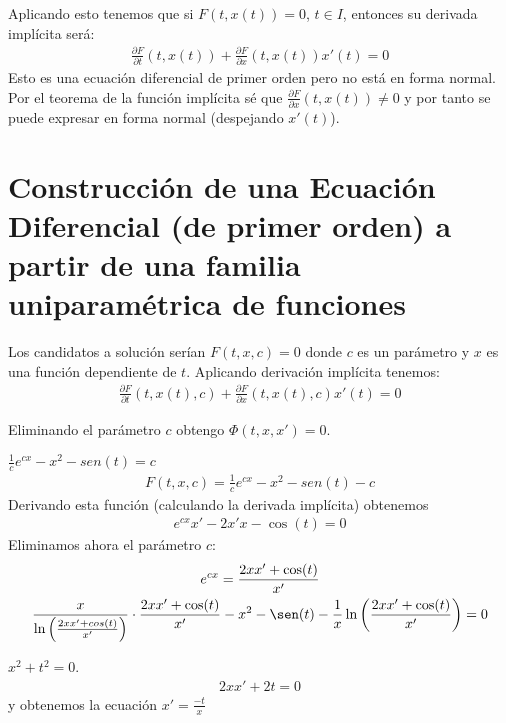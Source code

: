 Aplicando esto tenemos que si $F(t,x(t))=0$, $t\in I$, entonces su derivada implícita será:
\begin{gather*}
    \frac{\partial F}{\partial t}(t,x(t))+ \frac{\partial F}{\partial x}(t,x(t))x'(t)=0
\end{gather*}
Esto es una ecuación diferencial de primer orden pero no está en forma normal. Por el teorema de la función implícita sé que $\frac{\partial F}{\partial x}(t,x(t))\neq 0$ y por tanto se puede expresar en forma normal (despejando $x'(t)$).

\newpage

\section{Construcción de una Ecuación Diferencial (de primer orden) a partir de una familia uniparamétrica de funciones}

Los candidatos a solución serían $F(t,x,c)=0$ donde $c$ es un parámetro y $x$ es una función dependiente de $t$. Aplicando derivación implícita tenemos:
\begin{gather*}
    \frac{\partial F}{\partial t}(t,x(t), c)+ \frac{\partial F}{\partial x}(t,x(t),c)x'(t)=0
\end{gather*}

Eliminando el parámetro $c$ obtengo $\Phi(t,x,x')=0$.

\begin{ejemplo}
    $\frac{1}{c}e^{cx}-x^2-sen(t)=c$
    \begin{gather*}
        F(t,x,c) =\frac{1}{c} e^{cx}-x^2-sen(t)-c
    \end{gather*}
    Derivando esta función (calculando la derivada implícita) obtenemos
    \begin{gather*}
        e^{cx}x'-2x'x-\cos(t)=0
    \end{gather*}
    Eliminamos ahora el parámetro $c$:
    \begin{gather*}
        e^{cx} = \frac{2xx'+\cos(t)}{x'}\\
        \frac{x}{\ln\left(\frac{2xx'+cos(t)}{x'}\right)}\cdot{\frac{2xx'+\cos(t)}{x'}-x^2-\sen(t)-\frac{1}{x}\ln\left(\frac{2xx'+\cos(t)}{x'}\right)}=0
    \end{gather*}
    \endsquare
\end{ejemplo}

\begin{ejemplo}
    $x^2+t^2 = 0$.
    \begin{gather*}
        2xx'+2t=0
    \end{gather*}
    y obtenemos la ecuación $x'=\frac{-t}{x}$
\end{ejemplo}